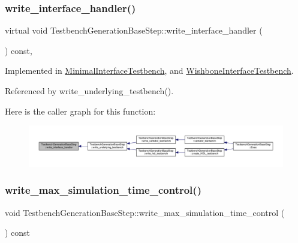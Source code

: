 \subsubsection{\texorpdfstring{write\+\_\+interface\+\_\+handler()}{write\_interface\_handler()}}
{\footnotesize\ttfamily virtual void Testbench\+Generation\+Base\+Step\+::write\+\_\+interface\+\_\+handler (\begin{DoxyParamCaption}{ }\end{DoxyParamCaption}) const\hspace{0.3cm}{\ttfamily [protected]}, {}}



Implemented in \hyperlink{classMinimalInterfaceTestbench_ab1139a5ae11ad46d2be19713199cb9e1}{Minimal\+Interface\+Testbench}, and \hyperlink{classWishboneInterfaceTestbench_a8a656572943eb09c0da774d124ab7a05}{Wishbone\+Interface\+Testbench}.



Referenced by write\+\_\+underlying\+\_\+testbench().

Here is the caller graph for this function\+:
\nopagebreak
\begin{figure}[H]
\begin{center}
\leavevmode
\includegraphics[width=350pt]{dc/d02/classTestbenchGenerationBaseStep_a7568b1b1e16628fecd673da73e8ed71b_icgraph}
\end{center}
\end{figure}
\mbox{\label{classTestbenchGenerationBaseStep_aaca8d78023026f97ce9f8bbb3bfc5699}} 
\subsubsection{\texorpdfstring{write\+\_\+max\+\_\+simulation\+\_\+time\+\_\+control()}{write\_max\_simulation\_time\_control()}}
{\footnotesize\ttfamily void Testbench\+Generation\+Base\+Step\+::write\+\_\+max\+\_\+simulation\+\_\+time\+\_\+control (\begin{DoxyParamCaption}{ }\end{DoxyParamCaption}) const\hspace{0.3cm}{\ttfamily [protected]}}



